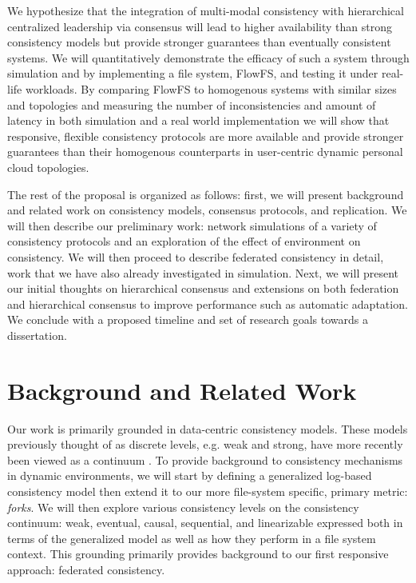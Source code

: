 \documentclass{article}
\begin{document}
We hypothesize that the integration of multi-modal consistency with hierarchical centralized leadership via consensus will lead to higher availability than strong consistency models but provide stronger guarantees than eventually consistent systems. We will quantitatively demonstrate the efficacy of such a system through simulation and by implementing a file system, FlowFS, and testing it under real-life workloads. By comparing FlowFS to homogenous systems with similar sizes and topologies and measuring the number of inconsistencies and amount of latency in both simulation and a real world implementation we will show that responsive, flexible consistency protocols are more available and provide stronger guarantees than their homogenous counterparts in user-centric dynamic personal cloud topologies.

The rest of the proposal is organized as follows: first, we will present background and related work on consistency models, consensus protocols, and replication. We will then describe our preliminary work: network simulations of a variety of consistency protocols and an exploration of the effect of environment on consistency. We will then proceed to describe federated consistency in detail, work that we have also already investigated in simulation. Next, we will present our initial thoughts on hierarchical consensus and extensions on both federation and hierarchical consensus to improve performance such as automatic adaptation. We conclude with a proposed timeline and set of research goals towards a dissertation.

\section{Background and Related Work}
\label{sec:background}

Our work is primarily grounded in data-centric consistency models. These models previously thought of as discrete levels, e.g. weak and strong, have more recently been viewed as a continuum \cite{yu_design_2002,afek_quasi-linearizability:_2010}. To provide background to consistency mechanisms in dynamic environments, we will start by defining a generalized log-based consistency model then extend it to our more file-system specific, primary metric: \textit{forks}. We will then explore various consistency levels on the consistency continuum: weak, eventual, causal, sequential, and linearizable expressed both in terms of the generalized model as well as how they perform in a file system context. This grounding primarily provides background to our first responsive approach: federated consistency.
\end{document}
